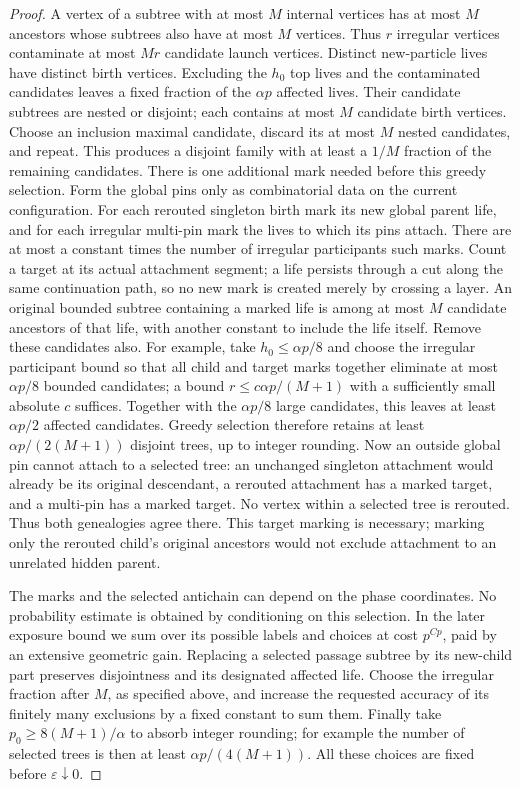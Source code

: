 \begin{proof}
A vertex of a subtree with at most $M$ internal vertices has at most $M$
ancestors whose subtrees also have at most $M$ vertices.  Thus $r$ irregular
vertices contaminate at most $Mr$ candidate launch vertices.  Distinct
new-particle lives have distinct birth vertices.  Excluding the $h_0$ top
lives and the contaminated candidates leaves a fixed fraction of the
$\alpha p$ affected lives.  Their candidate subtrees are nested or disjoint;
each contains at most $M$ candidate birth vertices.  Choose an inclusion
maximal candidate, discard its at most $M$ nested candidates, and repeat.
This produces a disjoint family with at least a $1/M$ fraction of the
remaining candidates.  There is one additional mark needed before this greedy selection.  Form
the global pins only as combinatorial data on the current configuration.
For each rerouted singleton birth mark its new global parent life, and for
each irregular multi-pin mark the lives to which its pins attach.  There
are at most a constant times the number of irregular participants such
marks.  Count a target at its actual attachment segment; a life persists
through a cut along the same continuation path, so no new mark is created
merely by crossing a layer.  An original bounded subtree containing a marked life is among at
most $M$ candidate ancestors of that life, with another constant to include
the life itself.  Remove these candidates also.  For example, take $h_0\le\alpha p/8$
and choose the irregular participant bound so that all child and target
marks together eliminate at most $\alpha p/8$ bounded candidates; a bound
$r\le c\alpha p/(M+1)$ with a sufficiently small absolute $c$ suffices.
Together with the $\alpha p/8$ large candidates, this leaves at least
$\alpha p/2$ affected candidates.  Greedy selection therefore retains at
least $\alpha p/(2(M+1))$ disjoint trees, up to integer rounding.  Now an outside global pin cannot attach to a
selected tree: an unchanged singleton attachment would already be its
original descendant, a rerouted attachment has a marked target, and a
multi-pin has a marked target.  No vertex within a selected tree is
rerouted.  Thus both genealogies agree there.  This target marking is
necessary; marking only the rerouted child's original ancestors would not
exclude attachment to an unrelated hidden parent.

The marks and the selected antichain can depend on the phase coordinates.
No probability estimate is obtained by conditioning on this selection.
In the later exposure bound we sum over its possible labels and choices at
cost $p^{Cp}$, paid by an extensive geometric gain.  Replacing a selected
passage subtree by its new-child part preserves disjointness and its
designated affected life.  Choose the irregular fraction after $M$, as
specified above, and increase the requested accuracy of its finitely many
exclusions by a fixed constant to sum them.  Finally take
$p_0\ge 8(M+1)/\alpha$ to absorb integer rounding; for example the number
of selected trees is then at least $\alpha p/(4(M+1))$.
All these choices are fixed before $\varepsilon\downarrow0$.
\end{proof}

